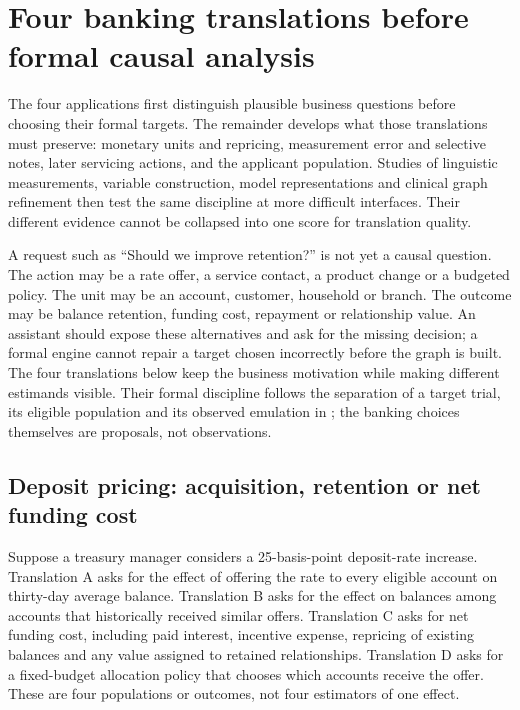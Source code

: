 \chapter{Four banking translations before formal causal analysis}
\label{exec13:l2-translation}

The four applications first distinguish plausible business questions before
choosing their formal targets. The remainder develops what those translations
must preserve: monetary units and repricing, measurement error and selective
notes, later servicing actions, and the applicant population. Studies of
linguistic measurements, variable construction, model representations and
clinical graph refinement then test the same discipline at more difficult
interfaces. Their different evidence cannot be collapsed into one score for
translation quality.

A request such as ``Should we improve retention?'' is not yet a causal question. The action may be a rate offer, a service contact, a product change or a budgeted policy. The unit may be an account, customer, household or branch. The outcome may be balance retention, funding cost, repayment or relationship value. An assistant should expose these alternatives and ask for the missing decision; a formal engine cannot repair a target chosen incorrectly before the graph is built. The four translations below keep the business motivation while making different estimands visible. Their formal discipline follows the separation of a target trial, its eligible population and its observed emulation in \citet{hernan2020}; the banking choices themselves are proposals, not observations.

\section{Deposit pricing: acquisition, retention or net funding cost}

Suppose a treasury manager considers a 25-basis-point deposit-rate increase. Translation A asks for the effect of offering the rate to every eligible account on thirty-day average balance. Translation B asks for the effect on balances among accounts that historically received similar offers. Translation C asks for net funding cost, including paid interest, incentive expense, repricing of existing balances and any value assigned to retained relationships. Translation D asks for a fixed-budget allocation policy that chooses which accounts receive the offer. These are four populations or outcomes, not four estimators of one effect.

